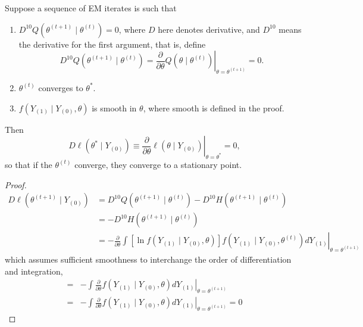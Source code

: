 \begin{theorem}
	Suppose a sequence of EM iterates is such that
	\begin{enumerate}
		\item \(D^{10} Q\left(\theta^{(t+1)} \mid \theta^{(t)}\right)=0\), where \(D\) here denotes derivative, and \(D^{10}\) means the derivative for the first argument, that is, define
		      \begin{equation}
			      D^{10} Q\left(\theta^{(t+1)}\mid\theta^{(t)}\right)=\left.\frac{\partial}{\partial \theta} Q\left(\theta \mid \theta^{(t)}\right)\right|_{\theta=\theta^{(t+1)}}=0.
		      \end{equation}
		\item \(\theta^{(t)}\) converges to \(\theta^{*}\).
		\item \(f\left(Y_{(1)} \mid Y_{(0)}, \theta\right)\) is smooth in \(\theta\), where smooth is defined in the proof.
	\end{enumerate}
	Then
	\begin{equation}
		\left.D \ell\left(\theta^{*} \mid Y_{(0)}\right) \equiv \frac{\partial}{\partial \theta} \ell\left(\theta \mid Y_{(0)}\right)\right|_{\theta=\theta^{*}}=0,
	\end{equation}
	so that if the \(\theta^{(t)}\) converge, they converge to a stationary point.
\end{theorem}

\begin{proof}
	\begin{equation}
		\begin{aligned}
			D \ell\left(\theta^{(t+1)} \mid Y_{(0)}\right) & =D^{10} Q\left(\theta^{(t+1)} \mid \theta^{(t)}\right)-D^{10} H\left(\theta^{(t+1)} \mid \theta^{(t)}\right)                                                                                       \\
			                                               & =-D^{10} H\left(\theta^{(t+1)} \mid \theta^{(t)}\right)                                                                                                                                            \\
			                                               & =-\left.\frac{\partial}{\partial \theta} \int\left[\ln f\left(Y_{(1)} \mid Y_{(0)}, \theta\right)\right] f\left(Y_{(1)} \mid Y_{(0)}, \theta^{(t)}\right) d Y_{(1)}\right|_{\theta=\theta^{(t+1)}}
		\end{aligned}
	\end{equation}
	which assumes sufficient smoothness to interchange the order of differentiation and integration,
	\begin{equation}
		\begin{aligned}
			= & -\int\left.\frac{\partial}{\partial \theta} f\left(Y_{(1)} \mid Y_{(0)}, \theta\right) d Y_{(1)}\right|_{\theta=\theta^{(t+1)}}    \\
			= & -\left.\int \frac{\partial}{\partial \theta} f\left(Y_{(1)} \mid Y_{(0)}, \theta\right) d Y_{(1)}\right|_{\theta=\theta^{(t+1)}}=0
		\end{aligned}
	\end{equation}
\end{proof}

